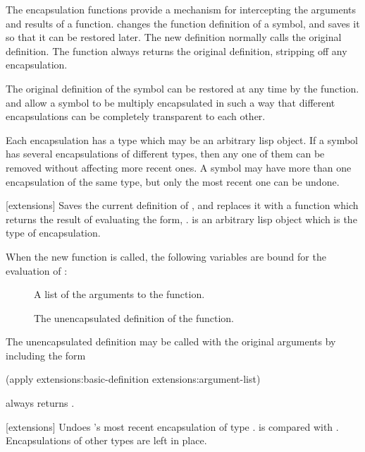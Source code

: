 The encapsulation functions provide a mechanism for intercepting the
arguments and results of a function.   changes the
function definition of a symbol, and saves it so that it can be
restored later.  The new definition normally calls the original
definition.  The \clisp{}  function always returns
the original definition, stripping off any encapsulation.

The original definition of the symbol can be restored at any time by
the  function.   and 
allow a symbol to be multiply encapsulated in such a way that different
encapsulations can be completely transparent to each other.

Each encapsulation has a type which may be an arbitrary lisp object.
If a symbol has several encapsulations of different types, then any
one of them can be removed without affecting more recent ones.
A symbol may have more than one encapsulation of the same type, but
only the most recent one can be undone.

[extensions]{}
Saves the current definition of , and replaces it with a
function which returns the result of evaluating the form, . 
 is an arbitrary lisp object which is the type of
encapsulation.

When the new function is called, the following variables are bound for the
evaluation of :
\begin{description}

\item[]
A list of the arguments to the function.

\item[]
The unencapsulated definition of the
function.
\end{description}
The unencapsulated definition may be called with the original
arguments by including the form
\begin{lisp}
(apply extensions:basic-definition extensions:argument-list)
\end{lisp}

 always returns .
\enddefun

[extensions]{} Undoes
's most recent encapsulation of type .
 is compared with .  Encapsulations of other types
are left in place.
\enddefun

